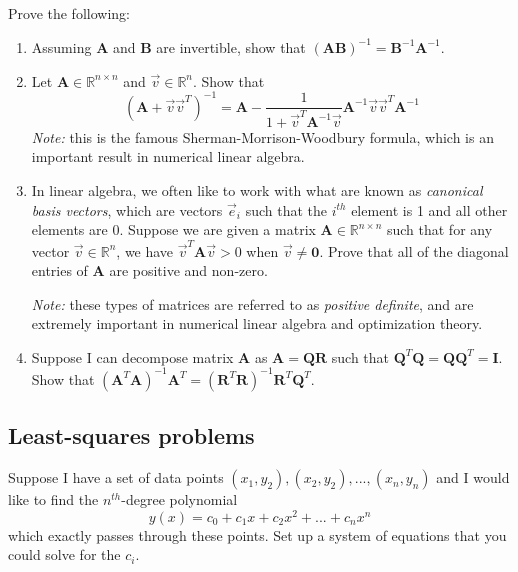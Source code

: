 \documentclass[letterpaper, 11pt]{article}
\begin{document}
\subsection{} Prove the following:
\begin{enumerate}[label=(\alph*)]
\item Assuming $\bm{A}$ and $\bm{B}$ are invertible, show that $(\bm{A}\bm{B})^{-1} = \bm{B}^{-1} \bm{A}^{-1}$. 

\item Let $ \bm{A} \in \mathbb{R}^{n \times n}$ and $\vec v \in \mathbb{R}^n$. Show that 
\[ (\bm{A} + \vec v \vec v^T )^{-1} = \bm{A} - \frac{1}{1 + \vec v^T \bm{A}^{-1} \vec v} \bm{A}^{-1} \vec v \vec v^T \bm{A}^{-1} \]
\textit{Note:} this is the famous Sherman-Morrison-Woodbury formula, which is an important result in numerical linear algebra. 

\item In linear algebra, we often like to work with what are known as \textit{canonical basis vectors}, which are vectors $\vec e_i$ such that the $i^{th}$ element is 1 and all other elements are 0. Suppose we are given a matrix $\bm{A} \in \mathbb{R}^{n \times n}$ such that for any vector $\vec v \in \mathbb{R}^n$, we have $\vec v ^T \bm{A} \vec v >0$ when $\vec v \neq \bm{0}$. Prove that all of the diagonal entries of $\bm{A}$ are positive and non-zero. 
\par \textit{Note:} these types of matrices are referred to as \textit{positive definite}, and are extremely important in numerical linear algebra and optimization theory. 

\item Suppose I can decompose matrix $\bm{A}$ as $\bm{A} = \bm{Q} \bm{R}$ such that $\bm{Q}^T\bm{Q} = \bm{Q}\bm{Q}^T = \bm{I}$. Show that $(\bm{A}^T\bm{A})^{-1} \bm{A}^T = (\bm{R}^T \bm{R})^{-1} \bm{R}^T \bm{Q}^T$. 

\end{enumerate}

\subsection{Least-squares problems} Suppose I have a set of data points $(x_1,y_2),(x_2,y_2),...,(x_n,y_n)$ and I would like to find the $n^{th}$-degree polynomial
\[y(x) = c_0 + c_1 x + c_2 x^2 + ... + c_n x^n\] 
which exactly passes through these points. Set up a system of equations that you could solve for the $c_i$. 

\end{document}
